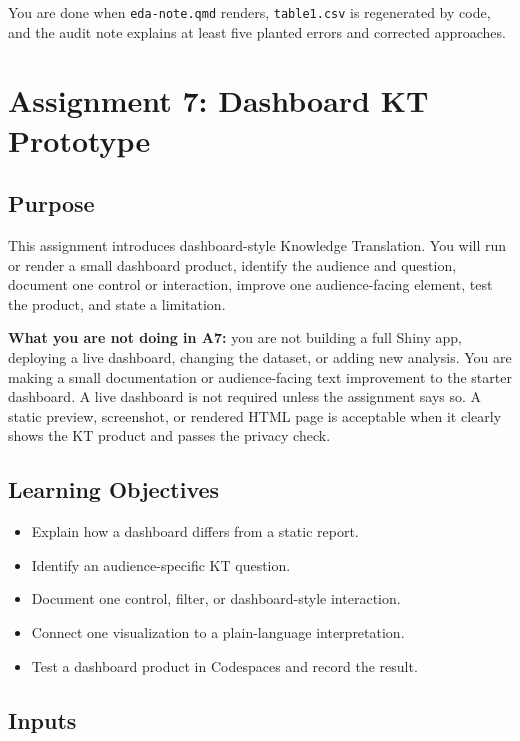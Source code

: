 \documentclass[
  letterpaper,
  DIV=11,
  numbers=noendperiod,
  oneside]{scrreprt}
\providecommand{\tightlist}{%
  \setlength{\itemsep}{0pt}\setlength{\parskip}{0pt}}
\begin{document}
You are done when \texttt{eda-note.qmd} renders, \texttt{table1.csv} is
regenerated by code, and the audit note explains at least five planted
errors and corrected approaches.

\chapter{Assignment 7: Dashboard KT
Prototype}\label{assignment-7-dashboard-kt-prototype}

\section{Purpose}\label{purpose-9}

This assignment introduces dashboard-style Knowledge Translation. You
will run or render a small dashboard product, identify the audience and
question, document one control or interaction, improve one
audience-facing element, test the product, and state a limitation.

\textbf{What you are not doing in A7:} you are not building a full Shiny
app, deploying a live dashboard, changing the dataset, or adding new
analysis. You are making a small documentation or audience-facing text
improvement to the starter dashboard. A live dashboard is not required
unless the assignment says so. A static preview, screenshot, or rendered
HTML page is acceptable when it clearly shows the KT product and passes
the privacy check.

\section{Learning Objectives}\label{learning-objectives-8}

\begin{itemize}
\tightlist
\item
  Explain how a dashboard differs from a static report.
\item
  Identify an audience-specific KT question.
\item
  Document one control, filter, or dashboard-style interaction.
\item
  Connect one visualization to a plain-language interpretation.
\item
  Test a dashboard product in Codespaces and record the result.
\end{itemize}

\section{Inputs}\label{inputs-8}
\end{document}
